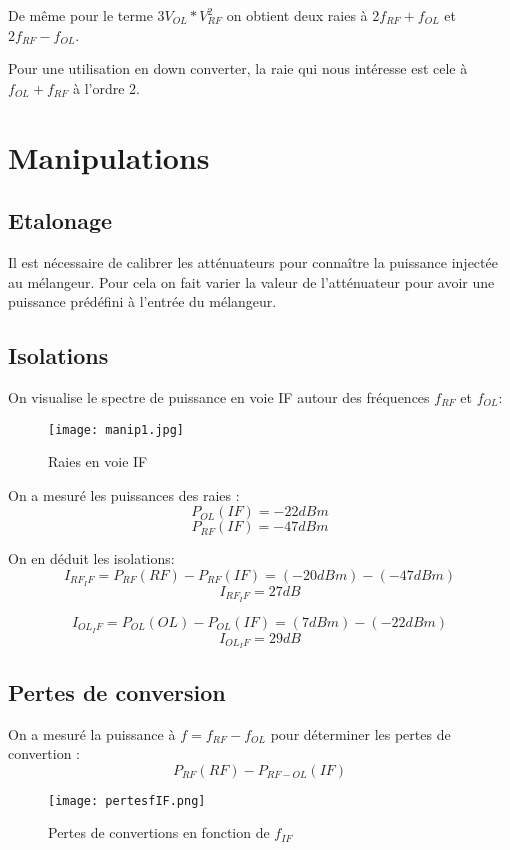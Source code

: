 \documentclass[oneside,a4paper,12pt]{article}
\begin{document}
	De même pour le terme $3 V_{OL} * V_{RF}^{2}$ on obtient deux raies à $ 2 f_{RF} + f_{OL} $ et  $ 2 f_{RF} - f_{OL} $.

	Pour une utilisation en down converter, la raie qui nous intéresse est cele à $ f_{OL} + f_{RF} $ à l'ordre 2.

	\newpage

	\section{Manipulations}

	\subsection{Etalonage}

	Il est nécessaire de calibrer les atténuateurs pour connaître la puissance injectée au mélangeur.
	Pour cela on fait varier la valeur de l'atténuateur pour avoir une puissance prédéfini à l'entrée du mélangeur.
	
	\subsection{Isolations}

	On visualise le spectre de puissance en voie IF autour des fréquences $f_{RF}$ et $f_{OL}$:

	\begin{figure}[h]
		\centering
		\texttt{[image: manip1.jpg]}	
		\caption{Raies en voie IF}
	\end{figure}

	On a mesuré les puissances des raies :
	\[ P_{OL}(IF) = -22dBm \]
	\[ P_{RF}(IF) = -47dBm \]

	On en déduit les isolations:
	\[ I_{RF_IF} = P_{RF}(RF) - P_{RF}(IF) = (-20 dBm) - (-47 dBm) \]
	\[ I_{RF_IF} = 27 dB \]

	\[ I_{OL_IF} = P_{OL}(OL) - P_{OL}(IF) = (7 dBm) - (-22 dBm) \]
	\[ I_{OL_IF} = 29 dB \]

	\newpage

	\subsection{Pertes de conversion}

	On a mesuré la puissance à $f = f_{RF}-f_{OL}$ pour déterminer les pertes de convertion :
	\[ P_{RF}(RF) - P_{RF-OL}(IF)  \]

	\begin{figure}[h]
		\centering
		\texttt{[image: pertesfIF.png]}	
		\caption{Pertes de convertions en fonction de $f_{IF}$}
	\end{figure}
\end{document}
